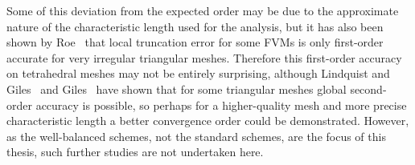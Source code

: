 Some of this deviation from the expected order may be due to the approximate nature of the characteristic length used for the analysis, but it has also been shown by Roe~\cite{Roe1987} that local truncation error for some FVMs is only first-order accurate for very irregular triangular meshes. Therefore this first-order accuracy on tetrahedral meshes may not be entirely surprising, although Lindquist and Giles~\cite{Lindquist1989} and Giles~\cite{Giles1989} have shown that for some triangular meshes global second-order accuracy is possible, so perhaps for a higher-quality mesh and more precise characteristic length a better convergence order could be demonstrated. However, as the well-balanced schemes, not the standard schemes, are the focus of this thesis, such further studies are not undertaken here.
